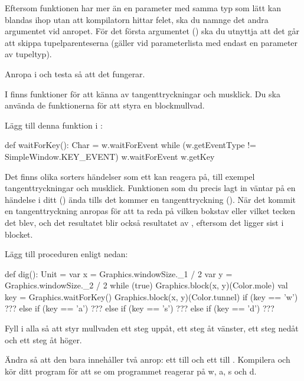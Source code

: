Eftersom funktionen  har mer än en parameter med samma typ som lätt kan blandas ihop utan att kompilatorn hittar felet, ska du namnge det andra argumentet  vid anropet. För det första argumentet () ska du utnyttja att det går att skippa tupelparenteserna (gäller vid parameterlista med endast en parameter av tupeltyp).

\Subtask Anropa  i  och testa så att det fungerar.

\Task
I  finns funktioner för att känna av tangenttryckningar och musklick.
Du ska använda de funktionerna för att styra en blockmullvad.

\Subtask
Lägg till denna funktion i :
\begin{Code}
  def waitForKey(): Char = {
    w.waitForEvent
    while (w.getEventType != SimpleWindow.KEY_EVENT) w.waitForEvent
    w.getKey
  }
\end{Code}
\noindent Det finns olika sorters händelser som ett  kan reagera på, till exempel tangenttryckningar och musklick.
Funktionen som du precis lagt in väntar på en händelse i ditt  () ända tills det kommer en tangenttryckning ().
När det kommit en tangenttryckning anropas  för att ta reda på vilken bokstav eller vilket tecken det blev, och det resultatet blir också resultatet av , eftersom det ligger sist i blocket.

\Subtask
Lägg till proceduren  enligt nedan:
\begin{Code}
  def dig(): Unit = {
    var x = Graphics.windowSize._1 / 2
    var y = Graphics.windowSize._2 / 2
    while (true) {
      Graphics.block(x, y)(Color.mole)
      val key = Graphics.waitForKey()
      Graphics.block(x, y)(Color.tunnel)
      if      (key == 'w') ???
      else if (key == 'a') ???
      else if (key == 's') ???
      else if (key == 'd') ???
    }
  }
\end{Code}

\Subtask Fyll i alla  så att  styr mullvaden ett steg uppåt,  ett steg åt vänster,  ett steg nedåt och  ett steg åt höger.

\Subtask Ändra  så att den bara innehåller två anrop: ett till  och ett till . Kompilera och kör ditt program för att se om programmet reagerar på w, a, s och d.

